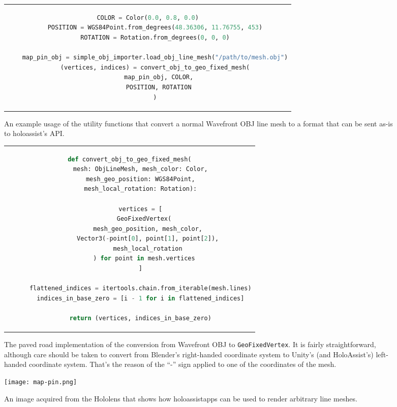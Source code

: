 \begin{figure}
  \centering
  \begin{tabular}{c}
  \begin{lstlisting}[language=python]
    COLOR = Color(0.0, 0.8, 0.0)
    POSITION = WGS84Point.from_degrees(48.36306, 11.76755, 453)
    ROTATION = Rotation.from_degrees(0, 0, 0)

    map_pin_obj = simple_obj_importer.load_obj_line_mesh("/path/to/mesh.obj")
    (vertices, indices) = convert_obj_to_geo_fixed_mesh(
      map_pin_obj, COLOR,
      POSITION, ROTATION
    )
  \end{lstlisting}
  \end{tabular}
  \caption{An example usage of the utility functions that convert a normal Wavefront OBJ line mesh to a format that can be sent as-is to \gls{holoassist}'s \gls{API}.}\label{lst:importing_an_obj_mesh}
\end{figure}

\begin{figure}
  \centering
  \begin{tabular}{c}
  \begin{lstlisting}[language=python]
    def convert_obj_to_geo_fixed_mesh(
      mesh: ObjLineMesh, mesh_color: Color,
      mesh_geo_position: WGS84Point,
      mesh_local_rotation: Rotation):

      vertices = [
        GeoFixedVertex(
          mesh_geo_position, mesh_color,
          Vector3(-point[0], point[1], point[2]),
          mesh_local_rotation
        ) for point in mesh.vertices
      ]

      flattened_indices = itertools.chain.from_iterable(mesh.lines)
      indices_in_base_zero = [i - 1 for i in flattened_indices]

      return (vertices, indices_in_base_zero)
  \end{lstlisting}
  \end{tabular}
  \caption{The paved road implementation of the conversion from Wavefront OBJ to \texttt{GeoFixedVertex}. It is fairly straightforward, although care should be taken to convert from Blender's right-handed coordinate system to Unity's (and HoloAssist's) left-handed coordinate system. That's the reason of the \enquote{-} sign applied to one of the coordinates of the mesh.}\label{lst:obj_to_geofixed_converter}
\end{figure}

\begin{figure}
  \centering
  \texttt{[image: map-pin.png]}
  \caption{An image acquired from the Hololens that shows how \glspl{holoassistapp} can be used to render arbitrary line meshes.}\label{fig:maps_pin_on_earth.png}
\end{figure}

